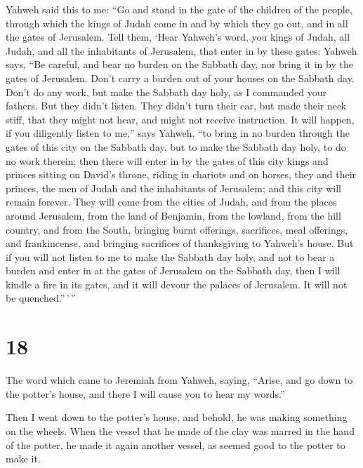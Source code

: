  Yahweh said this to me: ``Go and stand in the gate of the
children of the people, through which the kings of Judah come in and by
which they go out, and in all the gates of Jerusalem.  Tell
them, `Hear Yahweh's word, you kings of Judah, all Judah, and all the
inhabitants of Jerusalem, that enter in by these gates: 
Yahweh says, ``Be careful, and bear no burden on the Sabbath day, nor
bring it in by the gates of Jerusalem.  Don't carry a
burden out of your houses on the Sabbath day. Don't do any work, but
make the Sabbath day holy, as I commanded your fathers. 
But they didn't listen. They didn't turn their ear, but made their neck
stiff, that they might not hear, and might not receive instruction.
 It will happen, if you diligently listen to me,'' says
Yahweh, ``to bring in no burden through the gates of this city on the
Sabbath day, but to make the Sabbath day holy, to do no work therein;
 then there will enter in by the gates of this city kings
and princes sitting on David's throne, riding in chariots and on horses,
they and their princes, the men of Judah and the inhabitants of
Jerusalem; and this city will remain forever.  They will
come from the cities of Judah, and from the places around Jerusalem,
from the land of Benjamin, from the lowland, from the hill country, and
from the South, bringing burnt offerings, sacrifices, meal offerings,
and frankincense, and bringing sacrifices of thanksgiving to Yahweh's
house.  But if you will not listen to me to make the
Sabbath day holy, and not to bear a burden and enter in at the gates of
Jerusalem on the Sabbath day, then I will kindle a fire in its gates,
and it will devour the palaces of Jerusalem. It will not be
quenched.''\,'\,''

\hypertarget{section-17}{%
\section{18}\label{section-17}}

 The word which came to Jeremiah from Yahweh, saying,
 ``Arise, and go down to the potter's house, and there I
will cause you to hear my words.''

 Then I went down to the potter's house, and behold, he was
making something on the wheels.  When the vessel that he
made of the clay was marred in the hand of the potter, he made it again
another vessel, as seemed good to the potter to make it.


